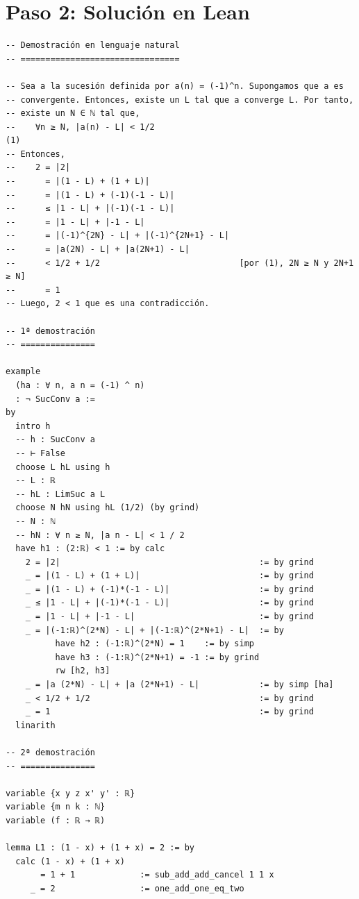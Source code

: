 \section{Paso 2: Solución en Lean}

\begin{verbatim}
-- Demostración en lenguaje natural
-- ================================

-- Sea a la sucesión definida por a(n) = (-1)^n. Supongamos que a es
-- convergente. Entonces, existe un L tal que a converge L. Por tanto,
-- existe un N ∈ ℕ tal que,
--    ∀n ≥ N, |a(n) - L| < 1/2                                      (1)
-- Entonces,
--    2 = |2|
--      = |(1 - L) + (1 + L)|
--      = |(1 - L) + (-1)(-1 - L)|
--      ≤ |1 - L| + |(-1)(-1 - L)|
--      = |1 - L| + |-1 - L|
--      = |(-1)^{2N} - L| + |(-1)^{2N+1} - L|
--      = |a(2N) - L| + |a(2N+1) - L|
--      < 1/2 + 1/2                            [por (1), 2N ≥ N y 2N+1 ≥ N]
--      = 1
-- Luego, 2 < 1 que es una contradicción.

-- 1ª demostración
-- ===============

example
  (ha : ∀ n, a n = (-1) ^ n)
  : ¬ SucConv a :=
by
  intro h
  -- h : SucConv a
  -- ⊢ False
  choose L hL using h
  -- L : ℝ
  -- hL : LimSuc a L
  choose N hN using hL (1/2) (by grind)
  -- N : ℕ
  -- hN : ∀ n ≥ N, |a n - L| < 1 / 2
  have h1 : (2:ℝ) < 1 := by calc
    2 = |2|                                        := by grind
    _ = |(1 - L) + (1 + L)|                        := by grind
    _ = |(1 - L) + (-1)*(-1 - L)|                  := by grind
    _ ≤ |1 - L| + |(-1)*(-1 - L)|                  := by grind
    _ = |1 - L| + |-1 - L|                         := by grind
    _ = |(-1:ℝ)^(2*N) - L| + |(-1:ℝ)^(2*N+1) - L|  := by
          have h2 : (-1:ℝ)^(2*N) = 1    := by simp
          have h3 : (-1:ℝ)^(2*N+1) = -1 := by grind
          rw [h2, h3]
    _ = |a (2*N) - L| + |a (2*N+1) - L|            := by simp [ha]
    _ < 1/2 + 1/2                                  := by grind
    _ = 1                                          := by grind
  linarith

-- 2ª demostración
-- ===============

variable {x y z x' y' : ℝ}
variable {m n k : ℕ}
variable (f : ℝ → ℝ)

lemma L1 : (1 - x) + (1 + x) = 2 := by
  calc (1 - x) + (1 + x)
       = 1 + 1             := sub_add_add_cancel 1 1 x
     _ = 2                 := one_add_one_eq_two


\end{verbatim}
